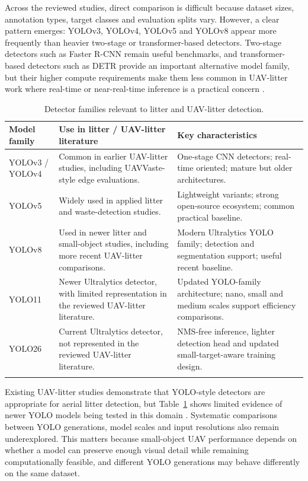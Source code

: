 Across the reviewed studies, direct comparison is difficult because dataset sizes, annotation types, target classes and evaluation splits vary. However, a clear pattern emerges: YOLOv3, YOLOv4, YOLOv5 and YOLOv8 appear more frequently than heavier two-stage or transformer-based detectors. Two-stage detectors such as Faster R-CNN remain useful benchmarks, and transformer-based detectors such as DETR provide an important alternative model family, but their higher compute requirements make them less common in UAV-litter work where real-time or near-real-time inference is a practical concern \cite{carion2020detr,zhu2021deformable_detr,kraft2021uavvaste,bartolo2026litterreview}.

\begin{table}[H]
\centering
\scriptsize
\begin{tabularx}{\textwidth}{p{} X p{}}
\toprule
\textbf{Model family} & \textbf{Use in litter / UAV-litter literature} & \textbf{Key characteristics} \\
\midrule
YOLOv3 / YOLOv4 & Common in earlier UAV-litter studies, including UAVVaste-style edge evaluations. & One-stage CNN detectors; real-time oriented; mature but older architectures. \\
\addlinespace
YOLOv5 & Widely used in applied litter and waste-detection studies. & Lightweight variants; strong open-source ecosystem; common practical baseline. \\
\addlinespace
YOLOv8 & Used in newer litter and small-object studies, including more recent UAV-litter comparisons. & Modern Ultralytics YOLO family; detection and segmentation support; useful recent baseline. \\
\addlinespace
YOLO11 & Newer Ultralytics detector, with limited representation in the reviewed UAV-litter literature. & Updated YOLO-family architecture; nano, small and medium scales support efficiency comparisons. \\
\addlinespace
YOLO26 & Current Ultralytics detector, not represented in the reviewed UAV-litter literature. & NMS-free inference, lighter detection head and updated small-target-aware training design. \\
\addlinespace
\bottomrule
\end{tabularx}
\caption{Detector families relevant to litter and UAV-litter detection.}
\label{tab:detector_families_lit}
\end{table}

Existing UAV-litter studies demonstrate that YOLO-style detectors are appropriate for aerial litter detection, but Table~\ref{tab:detector_families_lit} shows limited evidence of newer YOLO models being tested in this domain \cite{ultralytics_yolo11_docs,ultralytics_platform_docs}. Systematic comparisons between YOLO generations, model scales and input resolutions also remain underexplored. This matters because small-object UAV performance depends on whether a model can preserve enough visual detail while remaining computationally feasible, and different YOLO generations may behave differently on the same dataset.

